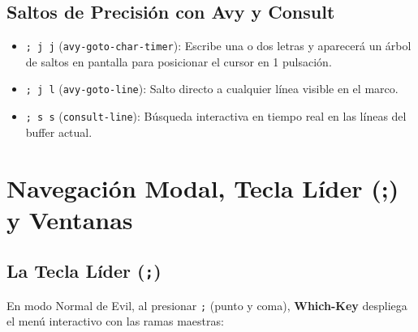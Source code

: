 \documentclass[11pt,book,spanish,alphabetic]{apuntes-scr}
\begin{document}
\section{Saltos de Precisión con Avy y Consult}
\begin{itemize}[leftmargin=8mm]
    \item \texttt{; j j} (\texttt{avy-goto-char-timer}): Escribe una o dos letras y aparecerá un árbol de saltos en pantalla para posicionar el cursor en 1 pulsación.
    \item \texttt{; j l} (\texttt{avy-goto-line}): Salto directo a cualquier línea visible en el marco.
    \item \texttt{; s s} (\texttt{consult-line}): Búsqueda interactiva en tiempo real en las líneas del buffer actual.
\end{itemize}

\chapter{Navegación Modal, Tecla Líder (;) y Ventanas}

\section{La Tecla Líder (\texttt{;})}
En modo Normal de Evil, al presionar \texttt{;} (punto y coma), \textbf{Which-Key} despliega el menú interactivo con las ramas maestras:
\end{document}
